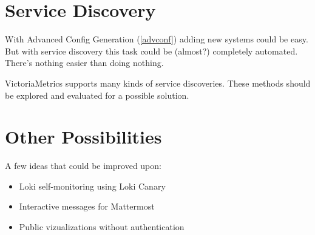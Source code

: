 
\section{Service Discovery}

With Advanced Config Generation (\autoref{advconf}) adding new systems could be
easy. But with service discovery this task could be (almost?) completely
automated. There's nothing easier than doing nothing.

VictoriaMetrics supports many kinds of service discoveries. These methods
should be explored and evaluated for a possible solution.

\section{Other Possibilities}

A few ideas that could be improved upon:
\begin{itemize}
	\item Loki self-monitoring using Loki Canary
	\item Interactive messages for Mattermost
	\item Public vizualizations without authentication
\end{itemize}
